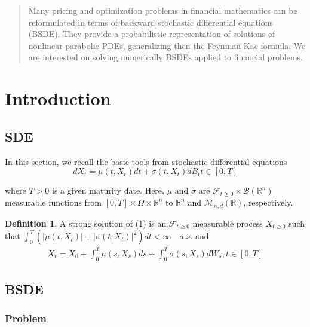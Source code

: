 \documentclass[english,11pt,openany]{article}
\theoremstyle{definition}
\newtheorem{defn}{Definition}[section]
\newcommand{\R}{\mathbb{R}}
\theoremstyle{plain}
\theoremstyle{definition}
\begin{document}
	
	\thispagestyle{empty}
	\newpage
	
	\tableofcontents
	\newpage
	
	
	\begin{abstract}
		
		Many pricing and optimization problems in financial mathematics can be reformulated
		in terms of backward stochastic differential equations (BSDE). 
		They provide a probabilistic representation of solutions of nonlinear parabolic PDEs, generalizing then the Feynman-Kac formula. 
		We are interested on solving numerically BSDEs applied to financial problems. 
	\end{abstract}
	
	\section{Introduction}
	
	\subsection{SDE}
	
	In this section, we recall the basic tools from stochastic differential equations 
	\begin{equation}
	dX_t = \mu(t,X_t)dt + \sigma (t, X_t) dB_t t\in [0,T] \label{eq:1}
	\end{equation}
	
	where $T >0$ is a given maturity date.  Here,  $\mu$ and $\sigma$ are $\mathcal{F}_{t \geq 0 }\times \mathcal{B}(\R^n)$ measurable functions from $[0,T] \times \Omega \times \R^n$ to $\R^n$ and $\mathcal{M}_{n, d}(\R)$,  respectively. 
	
	\begin{defn}
		A strong  solution  of (1) is  an $\mathcal{F}_{t \geq 0 }$ measurable process $X_{t\geq 0}$ such 
		that $\int_{0}^{T}(|\mu(t, X_t)|+|\sigma(t, X_t)|^2)dt < \infty \quad a.s.$  and 
		\begin{eqnarray}
		X_t = X_0 + \int_{0}^{T}\mu(s, X_s)ds + \int_{0}^{T}\sigma(s, X_s)dW_s, t \in [0,T] \label{eq:2}
		\end{eqnarray}
		
	\end{defn}
	
	
	\subsection{BSDE}
	
	\subsubsection{Problem}
	
\end{document}
